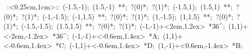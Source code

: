 
%


\hbox{
\xy    <1cm,0cm>:<0.25cm,1cm>::
       (-1.5,-1); (1.5,-1) **\dir{-}; ?(0)*\dir{<}; ?(1)*\dir{>};
       (-1.5,1); (1.5,1) **\dir{-}; ?(0)*\dir{<}; ?(1)*\dir{>};
       (-1,-1.5); (-1,1.5) **\dir{-}; ?(0)*\dir{<}; ?(1)*\dir{>};
       (1,-1.5); (1,1.5) **\dir{-}; ?(0)*\dir{<}; ?(1)*\dir{>};
       (-1.5,-1.5); (1.5,1.5) **\dir{-}; ?(0)*\dir{<}; ?(1)*\dir{>};
       (-1,-1)+<2em,1.2ex> *{36^\circ};
       (1,1)+<-2em,-1.2ex> *{36^\circ};
       (-1,-1)+<-0.6em,1.4ex> *{A};
       (1,1)+<-0.6em,1.4ex> *{C};
       (-1,1)+<-0.6em,1.4ex> *{D};
       (1,-1)+<0.6em,-1.4ex> *{B};
\endxy}


